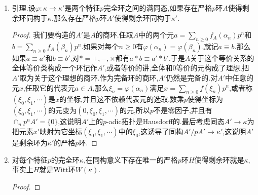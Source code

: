 \begin{enumerate}
\begin{proof}
    	因为$A$是严格$p$环,所以它的元素具有唯一表示$a=\sum_{n\ge0}f_A(\alpha_n)p^n$,那么要想使得图表交换,就要有:
    	$$g(a)=\sum_{n\ge0}g(f_A(\alpha_n))p^n=\sum_{n\ge0}f_{A'}(h(\alpha_n))p^n$$
    	
    	这就说明了唯一性.至于存在性,我们就按照这个等式定义$g$,只需说明它是环同态,以加法为例,设$b\in A$的唯一表示是$\sum_{n\ge0}f_A(\beta_n)p^n$,那么有:
    	\begin{align*}
    		g(a)+g(b)&=\sum_{n\ge0}g(f_A(\alpha_n))p^n+\sum_{n\ge0}g(f_A(\beta_n))p^n\\&=\sum_{n\ge0}f_{A'}(h(\alpha_n))p^n+\sum_{n\ge0}f_{A'}(h(\beta_n))p^n\\&=\sum_{n\ge0}f_{A'}\left(Q_n^+(h(\alpha_0),h(\alpha_1),\cdots;h(\beta_0),h(\beta_1),\cdots)\right)p^n\\&=\sum_{n\ge0}f_{A'}\left(h(Q_n^+(\alpha_0,\alpha_1,\cdots;\beta_0,\beta_1,\cdots))\right)p^n\\&=\sum_{n\ge0}g(f_A(Q_n^+(\alpha_0,\alpha_1,\cdots;\beta_0,\beta_1,\cdots)))\\&=g(a+b)
    	\end{align*}
    \end{proof}
    \item 引理.设$\varphi:\kappa\to\kappa'$是两个特征$p$完全环之间的满同态,如果存在严格$p$环$A$使得剩余环同构于$\kappa$,那么存在严格$p$环$A'$使得剩余环同构于$\kappa'$.
    \begin{proof}
    	
    	我们要构造的$A'$是$A$的商环.任取$A$中的两个元$a=\sum_{n\ge0}f_A(\alpha_n)p^n$和$b=\sum_{n\ge0}f_A(\beta_n)p^n$.如果对每个$n\ge0$有$\varphi(\alpha_n)=\varphi(\beta_n)$,就记$a\equiv b$.那么如果$a\equiv a'$和$b\equiv b'$,对$\ast=+,-,\times$都有$a\ast b\equiv a'\ast b'$.于是$A$关于这个等价关系的全体等价类构成一个环记作$A'$,或者等价的讲,全体和0等价的元构成了理想,把$A'$取为关于这个理想的商环.作为完备环的商环,$A'$仍然是完备的.对$A'$中任意的元$x$,任取它的代表元$a\in A$,那么$\xi_n=\varphi(\alpha_n)$满足$x=\sum_{n\ge0}f(\xi_n)p^n$,或者称$(\xi_0,\xi_1,\cdots)$是$x$的坐标,并且这不依赖代表元的选取.数乘$p$使得坐标为$(\xi_0,\xi_1,\cdots)$的元变为$(0,\xi_0,\xi_1,\cdots)$的元,所以$p$不是零因子,并且有$\cap_np^nA'=\{0\}$,这说明$A'$上的$p$-adic拓扑是Hausdorff的.最后考虑同态$A'\to\kappa$为把元素$x'$映射为它坐标$(\xi_0,\xi_1,\cdots)$中的$\xi_0$,这诱导了同构$A'/pA'\to\kappa'$,这说明$A'$是剩余环为$\kappa'$的严格$p$环.
    \end{proof}
    \item 对每个特征$p$的完全环$\kappa$,在同构意义下存在唯一的严格$p$环$H$使得剩余环就是$\kappa$,事实上$H$就是Witt环$W(\kappa)$.
    \begin{proof}
    	

\end{proof}
\end{enumerate}
